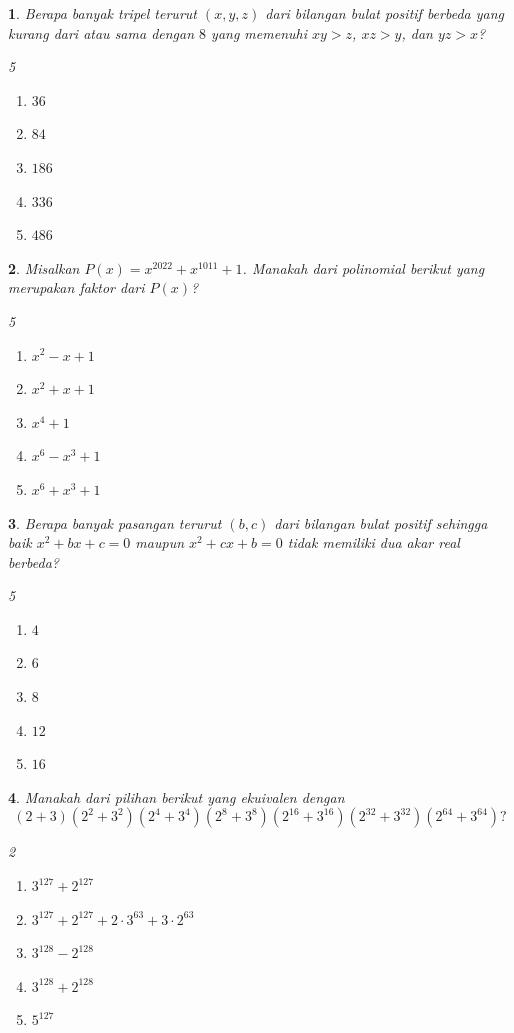 \documentclass[11pt,a4paper,DIV=12]{scrartcl}
\theoremstyle{problemstyle}
\newtheorem{problem}{}
\theoremstyle{answerstyle}
\newenvironment{choices}[1][5]{%
\raggedcolumns
  \begin{multicols}{#1}%
  \begin{enumerate}[label=(\Alph*)]%
}{%
  \end{enumerate}%
  \end{multicols}%
}
\begin{document}
\begin{problem}
  Berapa banyak tripel terurut $(x, y, z)$ dari bilangan bulat positif berbeda yang kurang dari atau sama dengan $8$ yang memenuhi $xy > z$, $xz > y$, dan $yz > x$?

  \begin{choices}
    \item $36$
    \item $84$
    \item $186$
    \item $336$
    \item $486$
  \end{choices}
\end{problem}

\begin{problem}
  Misalkan $P(x)=x^{2022}+x^{1011}+1$. Manakah dari polinomial berikut yang merupakan faktor dari $P(x)$?

  \begin{choices}
    \item $x^2-x+1$
    \item $x^2+x+1$
    \item $x^4+1$
    \item $x^6-x^3+1$
    \item $x^6+x^3+1$
  \end{choices}
\end{problem}

\begin{problem}
  Berapa banyak pasangan terurut $(b,c)$ dari bilangan bulat positif sehingga baik $x^2+bx+c=0$ maupun $x^2+cx+b=0$ tidak memiliki dua akar real berbeda?

  \begin{choices}
    \item $4$
    \item $6$
    \item $8$
    \item $12$
    \item $16$
  \end{choices}
\end{problem}

\begin{problem}
  Manakah dari pilihan berikut yang ekuivalen dengan
  \[
    (2+3)(2^2+3^2)(2^4+3^4)(2^8+3^8)(2^{16}+3^{16})(2^{32}+3^{32})(2^{64}+3^{64})?
  \]
  \begin{choices}[2]
    \item $3^{127}+2^{127}$
    \item $3^{127}+2^{127}+2\cdot 3^{63}+3\cdot 2^{63}$
    \item $3^{128}-2^{128}$
    \item $3^{128}+2^{128}$
    \item $5^{127}$
  \end{choices}
\end{problem}
\end{document}
